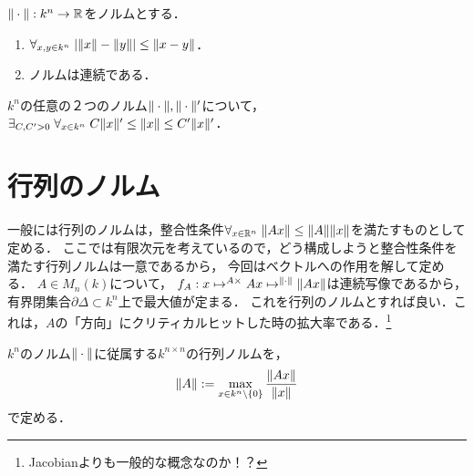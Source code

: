 \documentclass[uplatex, dvipdfmx]{jsreport}
\begin{document}
\begin{proposition}
    $\|\cdot\|:k^n\to\mathbb{R}$をノルムとする．
    \begin{enumerate}
        \item $\forall_{x,y\in k^n}\;\lvert\|x\|-\|y\|\rvert\le\|x-y\|$．
        \item ノルムは連続である．
    \end{enumerate}
\end{proposition}

\begin{proposition}
    $k^n$の任意の２つのノルム$\|\cdot\|,\|\cdot\|'$について，
    $\exists_{C,C'>0}\;\forall_{x\in k^n}\; C\|x\|'\le\|x\|\le C'\|x\|'$．
\end{proposition}

\section{行列のノルム}

\begin{tcolorbox}[colframe=ForestGreen, colback=ForestGreen!10!white,breakable,colbacktitle=ForestGreen!40!white,coltitle=black,fonttitle=\bfseries\sffamily,
title=]
    一般には行列のノルムは，整合性条件$\forall_{x\in\mathbb{R}^n}\;\|Ax\|\le\|A\|\|x\|$を満たすものとして定める．
    ここでは有限次元を考えているので，どう構成しようと整合性条件を満たす行列ノルムは一意であるから，
    今回はベクトルへの作用を解して定める．
    $A\in M_{n}(k)$について，
    $f_A:x\mapsto^{A\times }Ax\mapsto^{\|\cdot\|}\|Ax\|$は連続写像であるから，有界閉集合$\partial\Delta\subset k^n$上で最大値が定まる．
    これを行列のノルムとすれば良い．これは，$A$の「方向」にクリティカルヒットした時の拡大率である．\footnote{Jacobianよりも一般的な概念なのか！？}
\end{tcolorbox}

\begin{definition}
    $k^n$のノルム$\|\cdot\|$に従属する$k^{n\times n}$の行列ノルムを，
    \[
        \|A\|:=\max_{x\in k^n\setminus\{0\}}\frac{\|Ax\|}{\|x\|}
    \]
    で定める．
\end{definition}
\end{document}
